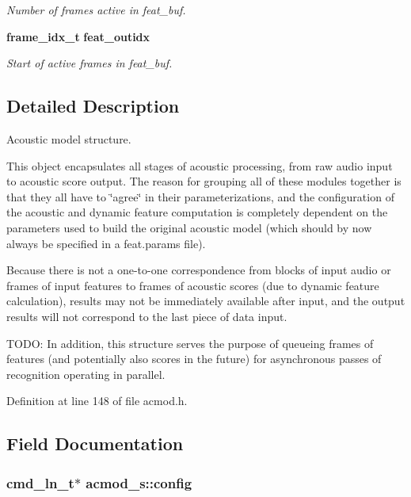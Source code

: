 \begin{DoxyCompactItemize}
\begin{DoxyCompactList}\small\item\em Number of frames active in feat\-\_\-buf. \end{DoxyCompactList}\item 
{\bf frame\-\_\-idx\-\_\-t} {\bf feat\-\_\-outidx}\label{structacmod__s_ae15076737bcdcbe1d5b4226f7a0b3f5b}

\begin{DoxyCompactList}\small\item\em Start of active frames in feat\-\_\-buf. \end{DoxyCompactList}\end{DoxyCompactItemize}


\subsection{Detailed Description}
Acoustic model structure. 

This object encapsulates all stages of acoustic processing, from raw audio input to acoustic score output. The reason for grouping all of these modules together is that they all have to \char`\"{}agree\char`\"{} in their parameterizations, and the configuration of the acoustic and dynamic feature computation is completely dependent on the parameters used to build the original acoustic model (which should by now always be specified in a feat.\-params file).

Because there is not a one-\/to-\/one correspondence from blocks of input audio or frames of input features to frames of acoustic scores (due to dynamic feature calculation), results may not be immediately available after input, and the output results will not correspond to the last piece of data input.

T\-O\-D\-O\-: In addition, this structure serves the purpose of queueing frames of features (and potentially also scores in the future) for asynchronous passes of recognition operating in parallel. 

Definition at line 148 of file acmod.\-h.



\subsection{Field Documentation}
\subsubsection[{config}]{\setlength{\rightskip}{0pt plus 5cm}cmd\-\_\-ln\-\_\-t$\ast$ acmod\-\_\-s\-::config}\label{structacmod__s_a3563f4d0bdc48d3ee140b9e28806279d}


